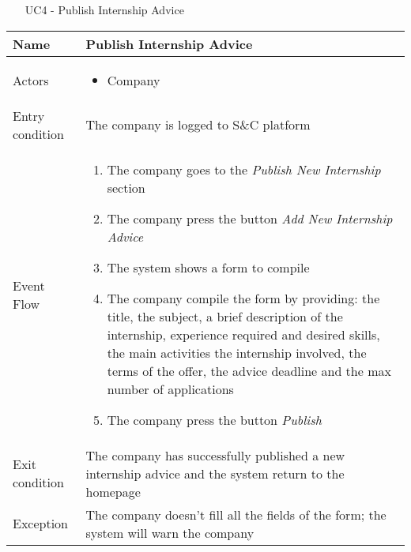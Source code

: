 			\begin{table} [H]
				\centering
					\begin{itemize}
					\item [UC4] - Publish Internship Advice
				\end{itemize}
				\begin{tabular}{|| P{7.5cm} | P{7.5cm} ||}
					\hline
					Name & Publish Internship Advice \\
					\hline
					Actors & \parbox{5cm}{\begin{itemize}
							\item Company
						\end{itemize}
					} \\
					\hline
					Entry condition & The company is logged to S\&C platform \\
					\hline
					Event Flow & \parbox{5cm}{\begin{enumerate}[label=\alpha]
							\item The company goes to the \textit{Publish 
							New Internship} section
							\item The company press the button \textit{Add 
							New Internship Advice} 
							\item The system shows a form to compile
							\item The company compile the form by 
							providing: the title, the subject, a 
							brief description of the internship, 
							experience required and desired 
							skills, the main activities the 
							internship involved, the terms of the 
							offer, the advice deadline and the 
							max number of applications
							\item The company press the button 
							\textit{Publish}
					\end{enumerate}} \\
					\hline 
					Exit condition & The company has successfully published a 
					new internship advice and the system 
					return to the homepage  \\
					\hline
					Exception & The company doesn’t fill all the 
					fields of the form; the system will 
					warn the company \\
					\hline
				\end{tabular}
				\end{table}
				
				
				
